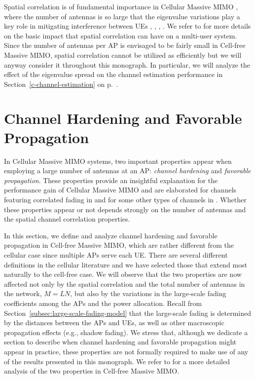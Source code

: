 Spatial correlation is of fundamental importance in Cellular Massive MIMO \cite{Sanguinetti2019a}, where the number of antennas is so large that the eigenvalue variations play a key role in mitigating interference between UEs \cite{BjornsonHS17}, \cite{Huh2012a},  \cite{Yin2016a}, \cite{Yin2013a}.
We refer to \cite[Sec.~2]{massivemimobook} for more details on the basic impact that spatial correlation can have on a multi-user system. Since the number of antennas per AP is envisaged to be fairly small in Cell-free Massive MIMO, spatial correlation cannot be utilized as efficiently but we will anyway consider it throughout this monograph.
In particular, we will analyze the effect of the eigenvalue spread on the channel estimation performance in Section~\ref{c-channel-estimation} on p.~\pageref{c-channel-estimation}. 






\section{Channel Hardening and Favorable Propagation}
\label{sec:hardening-favorable}

	
In Cellular Massive \gls{MIMO} systems, two important properties appear when employing a large number of antennas at an AP: \emph{channel hardening} and \emph{favorable propagation}. These properties provide an insightful explanation for the performance gain of Cellular Massive MIMO and are elaborated for channels featuring correlated fading in \cite[Sec.~2.5]{massivemimobook} and for some other types of channels in \cite[Ch.~7]{Marzetta2016a}. Whether these properties appear or not depends strongly on the number of antennas and the spatial channel correlation properties.

In this section, we define and  analyze channel hardening and favorable propagation in Cell-free Massive \gls{MIMO}, which are rather different from the cellular case since multiple APs serve each UE. There are several different definitions in the cellular literature and we have selected those that extend most naturally to the cell-free case. We will observe that the two properties are now affected not only by the spatial correlation and the total  number of antennas in the network, $M=LN$, but also by the variations in the large-scale fading coefficients among the APs and the power allocation.
Recall from Section~\ref{subsec:large-scale-fading-model} that the large-scale fading is determined by the distances between the APs and UEs, as well as other macroscopic propagation effects (e.g., shadow fading). 
We stress that, although we dedicate a section to describe when channel hardening and favorable propagation might appear in practice, these properties are not formally required to make use of any of the results presented in this monograph. We refer to \cite{Chen2018b} for a more detailed analysis of the two properties in Cell-free Massive MIMO. 


